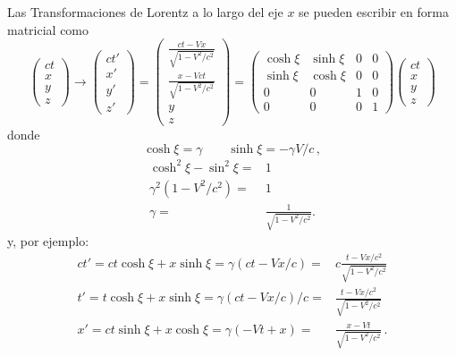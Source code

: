 Las Transformaciones de Lorentz  a lo largo del eje $x$ se pueden escribir en forma matricial como
\begin{equation}
\label{eq:147qft}
  \begin{pmatrix}
    ct\\
    x\\
    y\\
    z
  \end{pmatrix}\to
  \begin{pmatrix}
    ct'\\
    x'\\
    y'\\
    z'
  \end{pmatrix}=
  \begin{pmatrix}
    \frac{ct-Vx}{\sqrt{1-V^2/c^2}}\\
    \frac{x-Vct}{\sqrt{1-V^2/c^2}}\\
    y\\
    z
  \end{pmatrix}=
  \begin{pmatrix}
    \cosh\xi&\sinh\xi&0&0\\
    \sinh\xi&\cosh\xi&0&0\\
    0     &  0  &1&0\\
    0     &  0  &0&1
  \end{pmatrix}
  \begin{pmatrix}
    ct\\
    x\\
    y\\
    z
  \end{pmatrix}
\end{equation}
donde
\begin{equation}
  \cosh\xi=\gamma\qquad\sinh\xi=-\gamma V/c\,,
\end{equation}
\begin{align*}
\cosh^2\xi-\sin^2\xi=&1\nonumber\\
\gamma^2(1-V^2/c^2)=&1\nonumber\\
 \gamma=&\frac{1}{\sqrt{1-V^2/c^2}}.
\end{align*}
y, por ejemplo:
\begin{align}
ct'=  ct\cosh{\xi}+x\sinh\xi=\gamma(ct-V x/c)=&c\frac{t-V x/c^2}{\sqrt{1-V^2/c^2}}\nonumber\\
t'=  t\cosh{\xi}+x\sinh\xi=\gamma(ct-V x/c)/c=&\frac{t-V x/c^2}{\sqrt{1-V^2/c^2}}\nonumber\\
x'=  ct\sinh{\xi}+x\cosh\xi=\gamma(-Vt+ x)=&\frac{x-Vt}{\sqrt{1-V^2/c^2}}\,.
\end{align}

